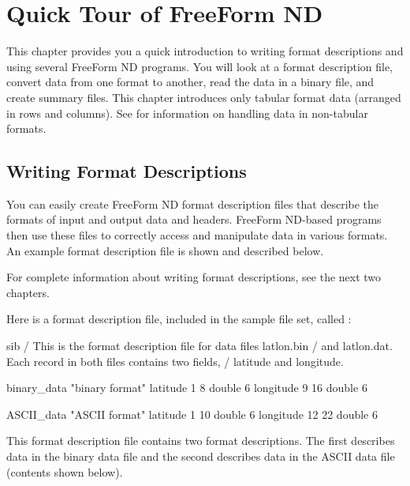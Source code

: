 %
%

\chapter{Quick Tour of FreeForm ND}
\label{ff,quick}

This chapter provides you a quick introduction to writing format
descriptions and using several FreeForm ND programs. You will look at
a format description file, convert data from one format to another,
read the data in a binary file, and create summary files. This chapter
introduces only tabular format data (arranged in rows and columns).
See  for information on handling data in
non-tabular formats.

\section{Writing Format Descriptions}

You can easily create FreeForm ND format description files that
describe the formats of input and output data and headers. FreeForm
ND-based programs then use these files to correctly access and
manipulate data in various formats. An example format description file
is shown and described below.

For complete information about writing format descriptions, see the
next two chapters.

Here is a format description file, included in the sample file set,
called :

\begin{vcode}{sib}
/ This is the format description file for data files latlon.bin 
/ and latlon.dat. Each record in both files contains two fields, 
/ latitude and longitude.

binary_data "binary format"
latitude 1 8 double 6
longitude 9 16 double 6

ASCII_data "ASCII format"
latitude 1 10 double 6
longitude 12 22 double 6 
\end{vcode}


This format description file contains two format descriptions. The
first describes data in the binary data file  and the
second describes data in the ASCII data file 
(contents shown below).

